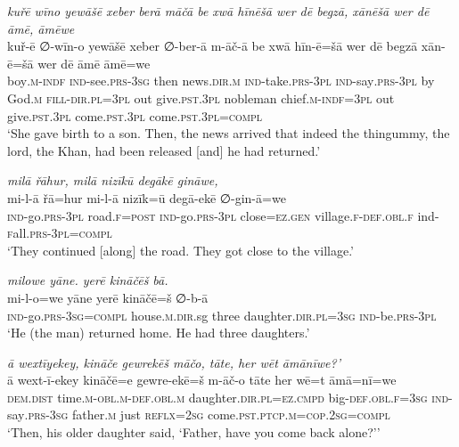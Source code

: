 \ea \label{KŠ.93}
\textit{kuřē wīno yewāšē xeber berā māčā be xwā hīnēšā wer dē begzā, xānēšā wer dē āmē, āmēwe} \\ 
\gll kuř-ē ∅-wīn-o yewāšē xeber ∅-ber-ā m-āč-ā be xwā hīn-ē=šā wer dē begzā xān-ē=šā wer dē āmē āmē=we \\ 
 boy\textsc{.m}\textsc{-indf} \textsc{ind-}see\textsc{.prs}\textsc{-3sg} then news\textsc{.dir}\textsc{.m} \textsc{ind-}take\textsc{.prs}\textsc{-3pl} \textsc{ind-}say\textsc{.prs}\textsc{-3pl} by God\textsc{.m} \textsc{fill}\textsc{-dir}\textsc{.pl}\textsc{=3pl} out give\textsc{.pst}\textsc{.3pl} nobleman chief\textsc{.m}\textsc{-indf}\textsc{=3pl} out give\textsc{.pst}\textsc{.3pl} come\textsc{.pst}\textsc{.3pl} come\textsc{.pst}\textsc{.3pl}\textsc{=compl} \\ 
\glt `She gave birth to a son. Then, the news arrived that indeed the thingummy, the lord, the Khan, had been released [and] he had returned.'
\z 
 
\ea \label{ŽH.15}
\textit{milā řāhur, milā nizīkū degākē gināwe,} \\ 
\gll mi-l-ā řā=hur mi-l-ā nizīk=ū degā-ekē ∅-gin-ā=we \\ 
 \textsc{ind-}go\textsc{.prs}\textsc{-3pl} road\textsc{\textsc{.f}}\textsc{=\textsc{post}} \textsc{ind-}go\textsc{.prs}\textsc{-3pl} close\textsc{=ez}\textsc{.gen} village\textsc{\textsc{.f}}\textsc{-def}\textsc{.obl}\textsc{\textsc{.f}} ind\textsc{-f}all\textsc{.prs}\textsc{-3pl}\textsc{=compl} \\ 
\glt `They continued [along] the road. They got close to the village.'
\z 
 
\ea \label{ŽH.20}
\textit{milowe yāne. yerē kināčēš bā.} \\ 
\gll mi-l-o=we yāne yerē kināčē=š ∅-b-ā \\ 
 \textsc{ind-}go\textsc{.prs}\textsc{-3sg}\textsc{=compl} house\textsc{.m}\textsc{.dir}.sg three daughter\textsc{.dir}\textsc{.pl}\textsc{=3sg} \textsc{ind-}be\textsc{.prs}\textsc{-3pl} \\ 
\glt `He (the man) returned home. He had three daughters.'
\z 
 
\ea \label{ŽH.22}
\textit{ā wextīyekey, kināče gewrekēš māčo, tāte, her wēt āmānīwe?’} \\ 
\gll ā wext-ī-ekey kināčē=e gewre-ekē=š m-āč-o tāte her wē=t āmā=nī=we \\ 
 \textsc{dem.dist} time\textsc{.m}\textsc{-obl}\textsc{.m}\textsc{-def}\textsc{.obl}\textsc{.m} daughter\textsc{.dir}\textsc{.pl}\textsc{=ez}\textsc{.cmpd} big\textsc{-def}\textsc{.obl}\textsc{\textsc{.f}}\textsc{=3sg} \textsc{ind-}say\textsc{.prs}\textsc{-3sg} father\textsc{.m} just \textsc{reflx}\textsc{=\textsc{2sg}} come\textsc{.pst}\textsc{.ptcp}\textsc{.m}\textsc{=cop}\textsc{.\textsc{2sg}}\textsc{=compl} \\ 
\glt `Then, his older daughter said, ‘Father, have you come back alone?’'
\z 
 
